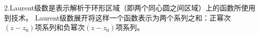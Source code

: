 \documentclass[12pt, a4paper, oneside]{article}
\begin{document}
\begin{spacing}{2.0}
2.Laurent级数是表示解析于环形区域（即两个同心圆之间区域）上的函数所使用到技术。
Laurent级数展开将这样一个函数表示为两个系列之和：正幂次$(z-z_0)$项系列和负幂次$(z-z_0)$项系列。
\end{spacing}{}



\end{document}
